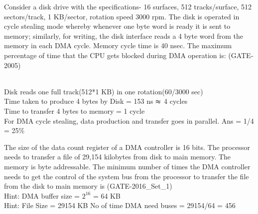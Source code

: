 \begin{questyle}
  \question  Consider a disk drive with the specifications- 16 surfaces, 512 tracks/surface,
  512 sectors/track, 1 KB/sector, rotation speed 3000 rpm. The disk is operated in cycle
  stealing mode whereby whenever one byte word is ready it is sent to memory; similarly,
  for writing, the disk interface reads a 4 byte word from the memory in each DMA cycle.
  Memory cycle time is 40 nsec. The maximum percentage of time that the CPU gets blocked
  during DMA operation is: (GATE-2005)

  \begin{oneparchoices}
  \end{oneparchoices}
\end{questyle}
  \\ Disk reads one full track(512*1 KB) in one rotation(60/3000 sec)
  \\ Time taken to produce 4 bytes by Disk = 153 ns \(\thickapprox\) 4 cycles
  \\ Time to transfer 4 bytes to memory    = 1 cycle
  \\ For DMA cycle stealing, data production and transfer goes in parallel. Ans = 1/4 = 25\%


\begin{questyle}
  \question  The size of the data count register of a DMA controller is 16 bits. The processor needs
  to transfer a file of 29,154 kilobytes from disk to main memory. The memory is byte addressable.
  The minimum number of times the DMA controller needs to get the control of the system bus
  from the processor to transfer the file from the disk to main memory is \fillin[456] (GATE-2016\_Set\_1)
  \\ Hint: DMA buffer size = \( \text{2}^\text{16} \) = 64 KB
  \\ Hint: File Size = 29154 KB \qquad No of time DMA need buses = 29154/64 = 456
\end{questyle}

















